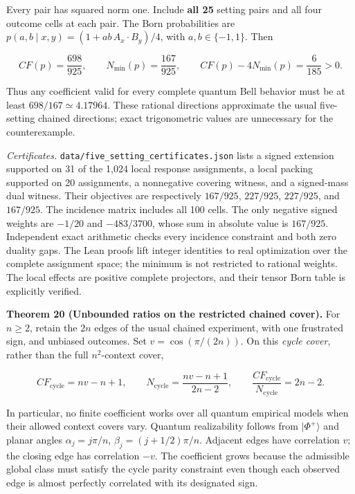 \documentclass[
]{article}
\begin{document}
Every pair has squared norm one. Include \textbf{all 25} setting pairs and all four outcome cells at each pair. The Born probabilities are \(p(a,b\mid x,y)=(1+ab\,A_x\cdot B_y)/4\), with \(a,b\in\{-1,1\}\). Then

\[
CF(p)=\frac{698}{925},\qquad N_{\min}(p)=\frac{167}{925},\qquad
CF(p)-4N_{\min}(p)=\frac6{185}>0.\tag{40}
\]

Thus any coefficient valid for every complete quantum Bell behavior must be at least \(698/167\simeq4.17964\). These rational directions approximate the usual five-setting chained directions; exact trigonometric values are unnecessary for the counterexample.

\emph{Certificates.} \texttt{data/five\_setting\_certificates.json} lists a signed extension supported on 31 of the 1,024 local response assignments, a local packing supported on 20 assignments, a nonnegative covering witness, and a signed-mass dual witness. Their objectives are respectively \(167/925\), \(227/925\), \(227/925\), and \(167/925\). The incidence matrix includes all 100 cells. The only negative signed weights are \(-1/20\) and \(-483/3700\), whose sum in absolute value is \(167/925\). Independent exact arithmetic checks every incidence constraint and both zero duality gaps. The Lean proofs lift integer identities to real optimization over the complete assignment space; the minimum is not restricted to rational weights. The local effects are positive complete projectors, and their tensor Born table is explicitly verified.

\textbf{Theorem 20 (Unbounded ratios on the restricted chained cover).} For \(n\ge2\), retain the \(2n\) edges of the usual chained experiment, with one frustrated sign, and unbiased outcomes. Set \(v=\cos(\pi/(2n))\). On this \emph{cycle cover}, rather than the full \(n^2\)-context cover,

\[
CF_{\mathrm{cycle}}=nv-n+1,\qquad
N_{\mathrm{cycle}}=\frac{nv-n+1}{2n-2},\qquad
\frac{CF_{\mathrm{cycle}}}{N_{\mathrm{cycle}}}=2n-2.\tag{41}
\]

In particular, no finite coefficient works over all quantum empirical models when their allowed context covers vary. Quantum realizability follows from \(|\Phi^+\rangle\) and planar angles \(\alpha_j=j\pi/n\), \(\beta_j=(j+1/2)\pi/n\). Adjacent edges have correlation \(v\); the closing edge has correlation \(-v\). The coefficient grows because the admissible global class must satisfy the cycle parity constraint even though each observed edge is almost perfectly correlated with its designated sign.
\end{document}
